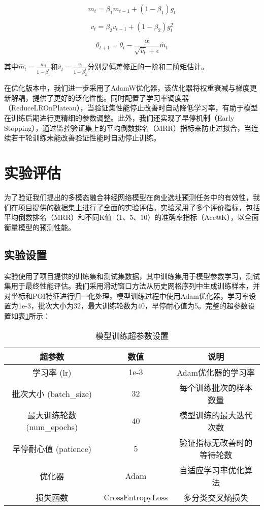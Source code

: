 \documentclass{article}
\begin{document}
\begin{equation}
m_t = \beta_1 m_{t-1} + (1-\beta_1) g_t
\end{equation}

\begin{equation}
v_t = \beta_2 v_{t-1} + (1-\beta_2) g_t^2
\end{equation}

\begin{equation}
\theta_{t+1} = \theta_t - \frac{\alpha}{\sqrt{\hat{v}_t} + \epsilon} \hat{m}_t
\end{equation}

其中$\hat{m}_t = \frac{m_t}{1-\beta_1^t}$和$\hat{v}_t = \frac{v_t}{1-\beta_2^t}$分别是偏差修正的一阶和二阶矩估计。

在优化版本中，我们进一步采用了AdamW优化器\cite{loshchilov_decoupled_2019}，该优化器将权重衰减与梯度更新解耦，提供了更好的泛化性能。同时配置了学习率调度器（ReduceLROnPlateau），当验证集性能停止改善时自动降低学习率，有助于模型在训练后期进行更精细的参数调整。此外，我们还实现了早停机制（Early Stopping），通过监控验证集上的平均倒数排名（MRR）指标来防止过拟合，当连续若干轮训练未能改善验证性能时自动停止训练。

\section{实验评估}

为了验证我们提出的多模态融合神经网络模型在商业选址预测任务中的有效性，我们在项目提供的数据集上进行了全面的实验评估。实验采用了多个评价指标，包括平均倒数排名（MRR）和不同K值（1、5、10）的准确率指标（Acc@K），以全面衡量模型的预测性能。

\subsection{实验设置}

实验使用了项目提供的训练集和测试集数据，其中训练集用于模型参数学习，测试集用于最终性能评估。我们采用滑动窗口方法从历史网格序列中生成训练样本，并对坐标和POI特征进行归一化处理。模型训练过程中使用Adam优化器，学习率设置为1e-3，批次大小为32，最大训练轮数为40，早停耐心值为5。完整的超参数设置如表\ref{tab:hyperparameters}所示：

\begin{table}[H]
\centering
\begin{tabular}{|c|c|c|}
\hline
\rowcolor[HTML]{D9EAD3}
\textbf{超参数} & \textbf{数值} & \textbf{说明} \\ \hline
学习率 (lr) & 1e-3 & Adam优化器的学习率 \\ \hline
批次大小 (batch\_size) & 32 & 每个训练批次的样本数量 \\ \hline
最大训练轮数 (num\_epochs) & 40 & 模型训练的最大迭代次数 \\ \hline
早停耐心值 (patience) & 5 & 验证指标无改善时的等待轮数 \\ \hline
优化器 & Adam & 自适应学习率优化算法 \\ \hline
损失函数 & CrossEntropyLoss & 多分类交叉熵损失 \\ \hline
\end{tabular}
\caption{模型训练超参数设置}
\label{tab:hyperparameters}
\end{table}
\end{document}
